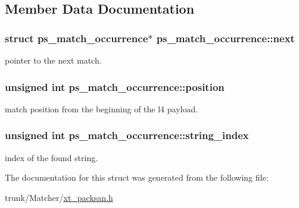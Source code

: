 \subsection{Member Data Documentation}
\hypertarget{structps__match__occurrence_adb7e4752d5cb73360067c26093773585}{
\subsubsection[{next}]{\setlength{\rightskip}{0pt plus 5cm}struct {\bf ps\_\-match\_\-occurrence}$\ast$ {\bf ps\_\-match\_\-occurrence::next}}}
\label{structps__match__occurrence_adb7e4752d5cb73360067c26093773585}
pointer to the next match. \hypertarget{structps__match__occurrence_a35fbbbfbd119e3851dbab1d79099fb75}{
\subsubsection[{position}]{\setlength{\rightskip}{0pt plus 5cm}unsigned int {\bf ps\_\-match\_\-occurrence::position}}}
\label{structps__match__occurrence_a35fbbbfbd119e3851dbab1d79099fb75}
match position from the beginning of the l4 payload. \hypertarget{structps__match__occurrence_a6b2be4aba7a429a5d4d6d2875cd0fb46}{
\subsubsection[{string\_\-index}]{\setlength{\rightskip}{0pt plus 5cm}unsigned int {\bf ps\_\-match\_\-occurrence::string\_\-index}}}
\label{structps__match__occurrence_a6b2be4aba7a429a5d4d6d2875cd0fb46}
index of the found string. 

The documentation for this struct was generated from the following file:\begin{DoxyCompactItemize}
\item 
trunk/Matcher/\hyperlink{xt__packsan_8h}{xt\_\-packsan.h}\end{DoxyCompactItemize}
